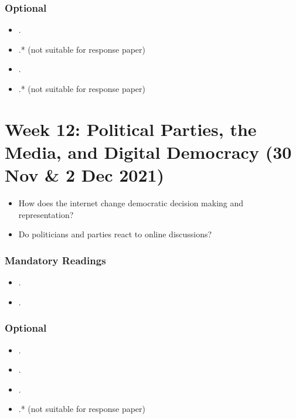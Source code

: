 \documentclass[abstract=on,parskip=full,headings=standardclasses,fontsize=11pt,paper=a4]{scrartcl}
\begin{document}
\subsubsection*{Optional}
\begin{itemize}
\item {}.
\item {}.* (not suitable for response paper)
\item {}.
\item {}.* (not suitable for response paper)
\end{itemize}



\section{Week 12: Political Parties, the Media, and Digital Democracy (30 Nov \& 2 Dec 2021)}


\begin{itemize}
\renewcommand\labelitemi{--}
\item How does the internet change democratic decision making and representation?
\item Do politicians and parties react to online discussions?
\end{itemize}

\subsubsection*{Mandatory Readings}
\begin{itemize}
\item {}.
\item {}.
\end{itemize}


\subsubsection*{Optional}
\begin{itemize}
\item {}.
\item {}.
\item {}.
\item {}.* (not suitable for response paper)
\end{itemize}


\end{document}
